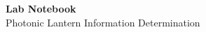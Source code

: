 \begin{titlepage}
    \begin{center}
    {\fontsize{40}{48}\selectfont \bfseries Lab Notebook} 
    \\\vspace{20pt}
    {\LARGE Photonic Lantern Information Determination} \\
    \vspace{20pt}
    \textbf{}
    \vspace{8pt}
    \end{center}
    
\end{titlepage}
